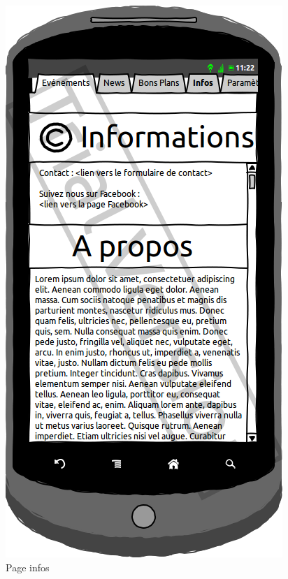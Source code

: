 \documentclass[a4paper, 11pt]{article}
\begin{document}
\begin{figure}[htbp]
\begin{minipage}[c]{.33\linewidth}
\begin{center}
			\includegraphics[scale=0.3]{../../Sketch/Android/Infos.png}
		\end{center}
	\caption{Page infos}
	\end{minipage}
\end{figure}
\end{document}
